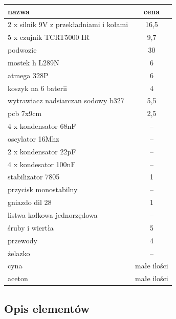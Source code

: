 \documentclass[a4paper,11pt]{article}
\begin{document}
\begin{center}

\begin{tabular}{|l | c|}

	\hline
	nazwa 										& cena			\\ \hline
	2 x silnik 9V z przekładniami i kołami 		& 16,5			\\
	5 x czujnik	TCRT5000 IR						& 9,7			\\
	podwozie										& 30				\\
	mostek h L289N								& 6				\\
	atmega 328P									& 6				\\
	koszyk na 6 baterii							& 4				\\
	wytrawiacz nadsiarczan sodowy b327			& 5,5			\\
	pcb	7x9cm									& 2,5			\\
	4 x kondensator 68nF							& --				\\
	oscylator 16Mhz								& --				\\
	2 x kondensator 22pF							& --				\\
	4 x kondesator 100nF							& --				\\
	stabilizator 7805							& 1				\\
	przycisk monostabilny						& --				\\
	gniazdo dil 28								& 1				\\
	listwa kołkowa jednorzędowa					& --				\\
	śruby i wiertła								& 5				\\
	przewody										& 4				\\
	żelazko										& --				\\
	cyna											& małe ilości	\\
	aceton										& małe ilości	\\
	\hline
\end{tabular}

\end{center}

\subsection{Opis elementów}
\end{document}
